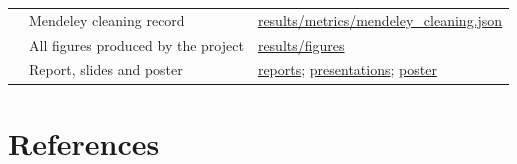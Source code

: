 \documentclass[11pt,a4paper]{article}
\begin{document}
\begin{table}[H]
\begin{tabularx}{\linewidth}{XXX}
 & Mendeley cleaning record & \href{https://github.com/rathiabeth-sudo/902---Module-2/blob/main/results/metrics/mendeley_cleaning.json}{results/metrics/mendeley\_cleaning.json} \\
 & All figures produced by the project & \href{https://github.com/rathiabeth-sudo/902---Module-2/tree/main/results/figures}{results/figures} \\
 & Report, slides and poster & \href{https://github.com/rathiabeth-sudo/902---Module-2/tree/main/reports}{reports}; \href{https://github.com/rathiabeth-sudo/902---Module-2/tree/main/presentations}{presentations}; \href{https://github.com/rathiabeth-sudo/902---Module-2/tree/main/poster}{poster} \\
\bottomrule
\end{tabularx}
\end{table}
\section*{References}
\end{document}
